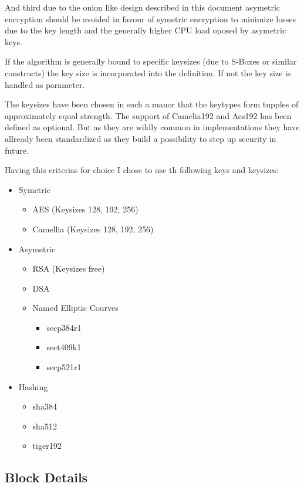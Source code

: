And third due to the onion like design described in this document asymetric encryption should be avoided in favour of symetric encryption to minimize losses due to the key length and the generally higher CPU load oposed by asymetric keys.

If the algorithm is generally bound to specific keysizes (due to S-Boxes or similar constructs) the key size is incorporated into the definition. If not the key size is handled as parameter.

The keysizes have been chosen in such a manor that the keytypes form tupples of approximately equal strength. The support of Camelia192 and Aes192 has been defined as optional. But as they are wildly common in implementations they have allready been standardized as they  build a possibility to step up security in future.

Having this criterias for choice I chose to use th following keys and keysizes:
\begin{itemize}
	\item Symetric
	\begin{itemize}
		\item AES (Keysizes 128, 192, 256)
		\item Camellia (Keysizes 128, 192, 256)
	\end{itemize}
	\item Asymetric
	\begin{itemize}
		\item RSA (Keysizes free)
		\item DSA
		\item Named Elliptic Courves
		\begin{itemize}
			\item secp384r1
			\item sect409k1
			\item secp521r1
		\end{itemize}
	\end{itemize}
	\item Hashing
	\begin{itemize}
		\item sha384
		\item sha512
		\item tiger192
	\end{itemize}
\end{itemize}



\subsection{Block Details}
